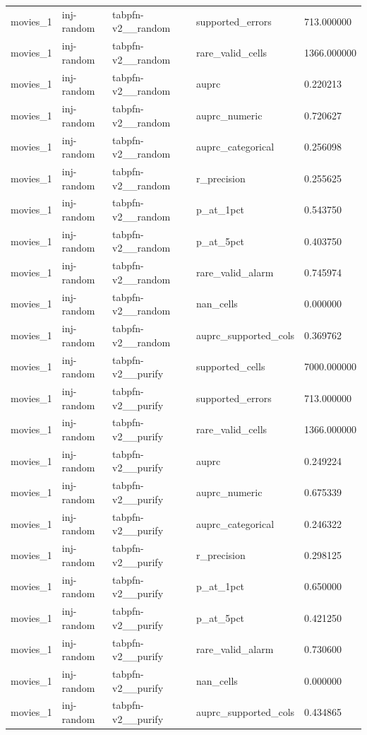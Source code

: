 \begin{tabular}{lllll}
movies\_1 & inj-random & tabpfn-v2\_\_random & supported\_errors & 713.000000 \\
movies\_1 & inj-random & tabpfn-v2\_\_random & rare\_valid\_cells & 1366.000000 \\
movies\_1 & inj-random & tabpfn-v2\_\_random & auprc & 0.220213 \\
movies\_1 & inj-random & tabpfn-v2\_\_random & auprc\_numeric & 0.720627 \\
movies\_1 & inj-random & tabpfn-v2\_\_random & auprc\_categorical & 0.256098 \\
movies\_1 & inj-random & tabpfn-v2\_\_random & r\_precision & 0.255625 \\
movies\_1 & inj-random & tabpfn-v2\_\_random & p\_at\_1pct & 0.543750 \\
movies\_1 & inj-random & tabpfn-v2\_\_random & p\_at\_5pct & 0.403750 \\
movies\_1 & inj-random & tabpfn-v2\_\_random & rare\_valid\_alarm & 0.745974 \\
movies\_1 & inj-random & tabpfn-v2\_\_random & nan\_cells & 0.000000 \\
movies\_1 & inj-random & tabpfn-v2\_\_random & auprc\_supported\_cols & 0.369762 \\
movies\_1 & inj-random & tabpfn-v2\_\_purify & supported\_cells & 7000.000000 \\
movies\_1 & inj-random & tabpfn-v2\_\_purify & supported\_errors & 713.000000 \\
movies\_1 & inj-random & tabpfn-v2\_\_purify & rare\_valid\_cells & 1366.000000 \\
movies\_1 & inj-random & tabpfn-v2\_\_purify & auprc & 0.249224 \\
movies\_1 & inj-random & tabpfn-v2\_\_purify & auprc\_numeric & 0.675339 \\
movies\_1 & inj-random & tabpfn-v2\_\_purify & auprc\_categorical & 0.246322 \\
movies\_1 & inj-random & tabpfn-v2\_\_purify & r\_precision & 0.298125 \\
movies\_1 & inj-random & tabpfn-v2\_\_purify & p\_at\_1pct & 0.650000 \\
movies\_1 & inj-random & tabpfn-v2\_\_purify & p\_at\_5pct & 0.421250 \\
movies\_1 & inj-random & tabpfn-v2\_\_purify & rare\_valid\_alarm & 0.730600 \\
movies\_1 & inj-random & tabpfn-v2\_\_purify & nan\_cells & 0.000000 \\
movies\_1 & inj-random & tabpfn-v2\_\_purify & auprc\_supported\_cols & 0.434865 \\

\end{tabular}
